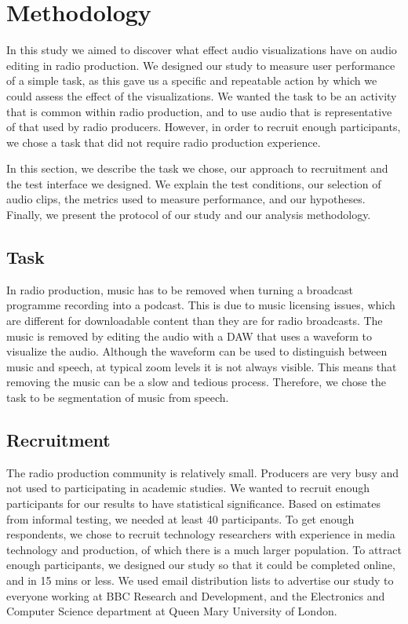 \section{Methodology}\label{sec:vis-method}

In this study we aimed to discover what effect audio visualizations have on audio editing in radio production.  We
designed our study to measure user performance of a simple task, as this gave us a specific and repeatable action by
which we could assess the effect of the visualizations.  We wanted the task to be an activity that is common within
radio production, and to use audio that is representative of that used by radio producers.  However, in order to
recruit enough participants, we chose a task that did not require radio production experience.

In this section, we describe the task we chose, our approach to recruitment and the test interface we designed.  We
explain the test conditions, our selection of audio clips, the metrics used to measure performance, and our hypotheses.
Finally, we present the protocol of our study and our analysis methodology.

\subsection{Task}
In radio production, music has to be removed when turning a broadcast programme recording into a podcast. This is due
to music licensing issues, which are different for downloadable content than they are for radio broadcasts. The music
is removed by editing the audio with a DAW that uses a waveform to visualize the audio. Although the waveform can be
used to distinguish between music and speech, at typical zoom levels it is not always visible. This means that removing
the music can be a slow and tedious process. Therefore, we chose the task to be segmentation of music from speech.

\subsection{Recruitment}
The radio production community is relatively small. Producers are very busy and not used to participating in academic
studies.  We wanted to recruit enough participants for our results to have statistical significance. Based on estimates
from informal testing, we needed at least 40 participants.  To get enough respondents, we chose to recruit technology
researchers with experience in media technology and production, of which there is a much larger population.  To attract
enough participants, we designed our study so that it could be completed online, and in 15 mins or less.  We used email
distribution lists to advertise our study to everyone working at BBC Research and Development, and the Electronics and
Computer Science department at Queen Mary University of London.

